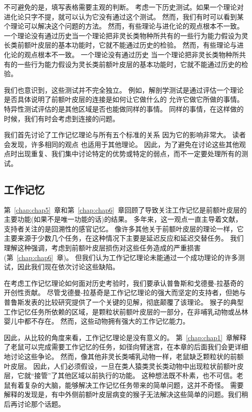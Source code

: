 不可避免的是，填写表格需要主观的判断。
考虑一下历史测试。如果一个理论对进化论只字不提，就可以认为它没有通过这个测试。
然而，我们有时可以看到某个理论可以解决这个问题的方法。 
然而，有些理论与进化论的观点根本不一致。
一个理论没有通过历史当一个理论把非灵长类物种所共有的一些行为能力假设为灵长类前额叶皮层的基本功能时，它就不能通过历史的检验。
然而，有些理论与进化论的观点根本不一致。
一个理论没有通过历史 当一个理论把非灵长类物种所共有的一些行为能力假设为灵长类前额叶皮层的基本功能时，它就不能通过历史的检验。
\par


我们也意识到，这些测试并不完全独立。
例如，解剖学测试是通过评估一个理论是否具体说明了前额叶皮层的连接是如何让它做什么的 允许它做它所做的事情。
特异性测试评估的是其他区域是否也能做同样的事情。
同样的事情，在这样做的时候，我们有时会考虑到连接的问题。
\par


我们首先讨论了工作记忆理论与所有五个标准的关系 因为它的影响非常大。
读者会发现，许多相同的观点 也适用于其他理论。
因此，为了避免在讨论这些其他观点时出现重复、我们集中讨论特定的优势或特定的弱点，而不一定要处理所有的测试。



\subsection{工作记忆}

第~\ref{chap:chap5}~章和第~\ref{chap:chap6}~章回顾了导致关注工作记忆是前额叶皮层的主要功能(如果不是唯一功能的话)的结果\cite{goldman2011circuitry}。
多年来，这一观点一直主导着文献，支持者关注的是回溯性的感官记忆。
像许多其他关于前额叶皮层的理论一样，它主要来源于少数几个任务，在这种情况下主要是延迟反应和延迟交替任务。
我们理解这种强调，考虑到前额叶皮层损伤对这些任务造成的严重损害(第~\ref{chap:chap6}~章)。
但我们认为工作记忆理论未能通过一个成功理论的许多测试，因此我们现在依次讨论这些缺陷。
\par


在考虑工作记忆理论如何面对历史考验时，我们要承认普鲁斯和戈德曼-拉基奇\cite{preuss1991myelo,preuss1991ipsilateral}的开创性贡献。
尽管戈德曼-拉基奇是工作记忆理论的强大而坚定的支持者，但她与普鲁斯发表的比较研究提供了一个关键的见解，彻底颠覆了该理论。
猴子的典型工作记忆任务所依赖的区域，是颗粒状前额叶皮层的一部分，在非哺乳动物或丛林婴儿中都不存在。
然而，这些动物拥有强大的工作记忆能力。
\par


因此，从比较的角度来看，工作记忆理论是没有意义的。
第~\ref{chap:chap1}~章解释了老鼠可以完成需要工作记忆的任务，如径向臂迷宫，在本章的后面我们会更详细地讨论这些争论。
然而，像其他非灵长类哺乳动物一样，老鼠缺乏颗粒状的前额叶皮层。
因此，人们必须假设，一旦在类人猿类灵长类动物中出现粒状前额叶皮层，它就“接管”了其他区域以前执行的功能。
这种想法既不朴素，也不可信。老鼠有着复杂的大脑，能够解决工作记忆任务带来的简单问题，这并不奇怪。
需要解释的发现是，有中外侧前额叶皮层病变的猴子无法解决这些简单的问题。我们稍后再讨论那个话题。
\par


